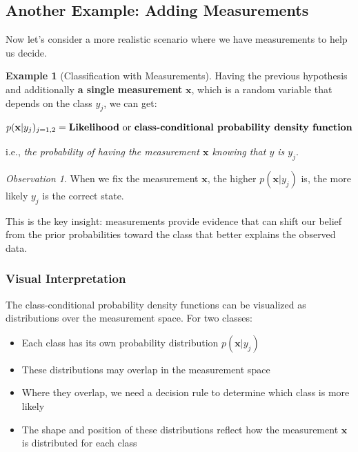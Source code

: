 \documentclass[11pt,a4paper]{article}
\theoremstyle{definition}
\newtheorem{example}{Example}[section]
\theoremstyle{plain}
\theoremstyle{remark}
\newtheorem*{observation}{Observation}
\begin{document}
\subsection{Another Example: Adding Measurements}

Now let's consider a more realistic scenario where we have measurements to help us decide.

\begin{example}[Classification with Measurements]
Having the previous hypothesis and additionally \textbf{a single measurement} $\mathbf{x}$, which is a random variable that depends on the class $y_j$, we can get:

\[
p(\mathbf{x}|y_j)_{j=1,2} = \text{\textbf{Likelihood}} \text{ or } \text{\textbf{class-conditional probability density function}}
\]

i.e., \textit{the probability of having the measurement $\mathbf{x}$ knowing that $y$ is $y_j$}.
\end{example}

\begin{observation}
When we fix the measurement $\mathbf{x}$, the higher $p(\mathbf{x}|y_j)$ is, the more likely $y_j$ is the correct state.

This is the key insight: measurements provide evidence that can shift our belief from the prior probabilities toward the class that better explains the observed data.
\end{observation}

\subsubsection{Visual Interpretation}

The class-conditional probability density functions can be visualized as distributions over the measurement space. For two classes:

\begin{itemize}
    \item Each class has its own probability distribution $p(\mathbf{x}|y_j)$
    \item These distributions may overlap in the measurement space
    \item Where they overlap, we need a decision rule to determine which class is more likely
    \item The shape and position of these distributions reflect how the measurement $\mathbf{x}$ is distributed for each class
\end{itemize}
\end{document}
